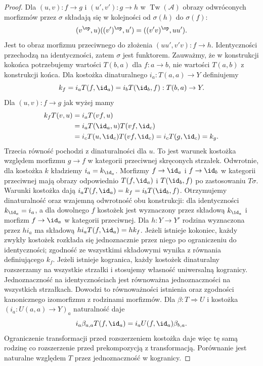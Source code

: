 \begin{proof}
Dla $(u,v):f\to g$ i $(u',v'):g\to h$ w $\operatorname{Tw}(\mathcal A)$ obrazy odwróconych morfizmów przez $\sigma$ składają się w kolejności od $\sigma(h)$ do $\sigma(f)$:
\[
 (v^{\op},u)((v')^{\op},u')
 =((v'v)^{\op},uu').
\]
Jest to obraz morfizmu przeciwnego do złożenia $(uu',v'v):f\to h$. Identyczności przechodzą na identyczności, zatem $\sigma$ jest funktorem. Zauważmy, że w konstrukcji kokońca potrzebujemy wartości $T(b,a)$ dla $f:a\to b$, nie wartości $T(a,b)$ z konstrukcji końca. Dla kostożka dinaturalnego $i_a:T(a,a)\to Y$ definiujemy
\[
 k_f=i_a T(f,\id_a)=i_b T(\id_b,f):T(b,a)\to Y.
\]
Dla $(u,v):f\to g$ jak wyżej mamy
\begin{align*}
 k_f T(v,u)
 &=i_a T(vf,u)\\
 &=i_a T(\id_a,u)T(vf,\id_c)\\
 &=i_c T(u,\id_c)T(vf,\id_c)
 =i_c T(g,\id_c)=k_g.
\end{align*}
Trzecia równość pochodzi z dinaturalności dla $u$. To jest warunek kostożka względem morfizmu $g\to f$ w kategorii przeciwnej skręconych strzałek. Odwrotnie, dla kostożka $k$ kładziemy $i_a=k_{\id_a}$. Morfizmy $f\to\id_a$ i $f\to\id_b$ w kategorii przeciwnej mają obrazy odpowiednio $T(f,\id_a)$ i $T(\id_b,f)$ po zastosowaniu $T\sigma$. Warunki kostożka dają $i_a T(f,\id_a)=k_f=i_b T(\id_b,f)$. Otrzymujemy dinaturalność oraz wzajemną odwrotność obu konstrukcji: dla identyczności $k_{\id_a}=i_a$, a dla dowolnego $f$ kostożek jest wyznaczony przez składową $k_{\id_a}$ i morfizm $f\to\id_a$ w kategorii przeciwnej. Dla $h:Y\to Y'$ rodzina wyznaczona przez $hi_a$ ma składową $hi_aT(f,\id_a)=hk_f$. Jeżeli istnieje kokoniec, każdy zwykły kostożek rozkłada się jednoznacznie przez niego po ograniczeniu do identyczności; zgodność ze wszystkimi składowymi wynika z równania definiującego $k_f$. Jeżeli istnieje kogranica, każdy kostożek dinaturalny rozszerzamy na wszystkie strzałki i stosujemy własność uniwersalną kogranicy. Jednoznaczność na identycznościach jest równoważna jednoznaczności na wszystkich strzałkach. Dowodzi to równoważności istnienia oraz zgodności kanonicznego izomorfizmu z rodzinami morfizmów. Dla $\beta:T\Rightarrow U$ i kostożka $(i_a:U(a,a)\to Y)_a$ naturalność daje
\[
 i_a\beta_{a,a}T(f,\id_a)
 =i_a U(f,\id_a)\beta_{b,a}.
\]
Ograniczenie transformacji przed rozszerzeniem kostożka daje więc tę samą rodzinę co rozszerzenie przed prekompozycją z transformacją. Porównanie jest naturalne względem $T$ przez jednoznaczność w kogranicy.
\end{proof}
